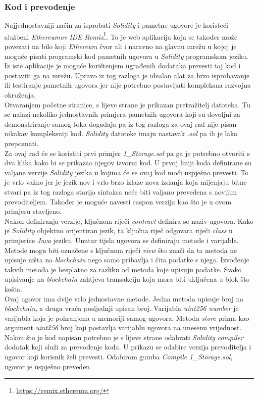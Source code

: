 \documentclass[times, utf8, zavrsni, numeric]{fer}
\begin{document}
\subsubsection{Kod i prevođenje}
Najjednostavniji način za isprobati \emph{Solidity} i pametne ugovore je koristeći službeni \emph{Ethereumov IDE Remix}\footnote{\url{https://remix.ethereum.org/}}. 
To je web aplikacija koja se također može povezati na bilo koji \emph{Ethereum} čvor ali i naravno na glavnu mrežu u kojoj je moguće pisati programski kod
pametnih ugovora u \emph{Solidity} programskom jeziku. Iz iste aplikacije je moguće korištenjem ugrađenih dodataka prevesti taj kod i postaviti ga na mrežu.
Upravo iz tog razloga je idealan alat za brzo isprobavanje ili testiranje pametnih ugovora jer nije potrebno postavljati kompleksna razvojna okruženja. \\
Otvaranjem početne stranice, s lijeve strane je prikazan pretražitelj datoteka. Tu se nalazi nekoliko jednostavnih primjera pametnih ugovora koji su dovoljni
za demonstriranje samog toka događaja pa iz tog razloga za ovaj rad nije pisan nikakav kompleksniji kod. \emph{Solidity} datoteke imaju nastavak \emph{.sol}
pa ih je lako prepoznati. \\
Za ovaj rad će se koristiti prvi primjer \emph{1\_Storage.sol} pa ga je potrebno otvoriti s dva klika kako bi se prikazao njegov izvorni kod.
U prvoj liniji koda definirane su valjane verzije \emph{Solidity} jezika u kojima će se ovaj kod moći uspješno prevesti. To je vrlo važno jer je jezik
nov i vrlo brzo izlaze nova izdanja koja mijenjaju bitne stvari pa iz tog razloga starija sintaksa neće biti valjano prevedena s novijim prevoditeljem. Također je moguće
navesti raspon verzija kao što je u ovom primjeru stavljeno. \\
Nakon definiranja verzije, ključnom riječi \emph{contract} definira se naziv ugovora. Kako je \emph{Solidity} objektno orijentiran jezik, ta ključna riječ odgovara 
riječi \emph{class} u primjerice \emph{Java} jeziku. Unutar tijela ugovora se definiraju metode i varijable. Metode mogu biti označene s ključnom riječi \emph{view} što
znači da ta metoda ne upisuje ništa na \emph{blockchain} nego samo pribavlja i čita podatke s njega. Izvođenje takvih metoda je besplatno za razliku od metoda koje
upisuju podatke. Svako upisivanje na \emph{blockchain} zahtjeva transakciju koja mora biti uključena u blok što košta. \\
Ovaj ugovor ima dvije vrlo jednostavne metode. Jedna metoda upisuje broj na \emph{blockchain}, a druga vraća posljednji upisan broj. 
Varijabla \emph{uint256 number} je varijabla koja je pohranjena u memoriji samog ugovora. Metoda \emph{store} prima kao argument \emph{uint256} broj koji postavlja 
varijablu ugovora na unesenu vrijednost. \\
Nakon što je kod napisan potrebno je s lijeve strane odabrati \emph{Solidity compiler} dodatak koji služi za prevođenje koda. U prikazu se odabire verzija prevoditelja
i ugovor koji korisnik želi prevesti. Odabirom gumba \emph{Compile 1\_Storage.sol}, ugovor je uspješno preveden.
\end{document}
